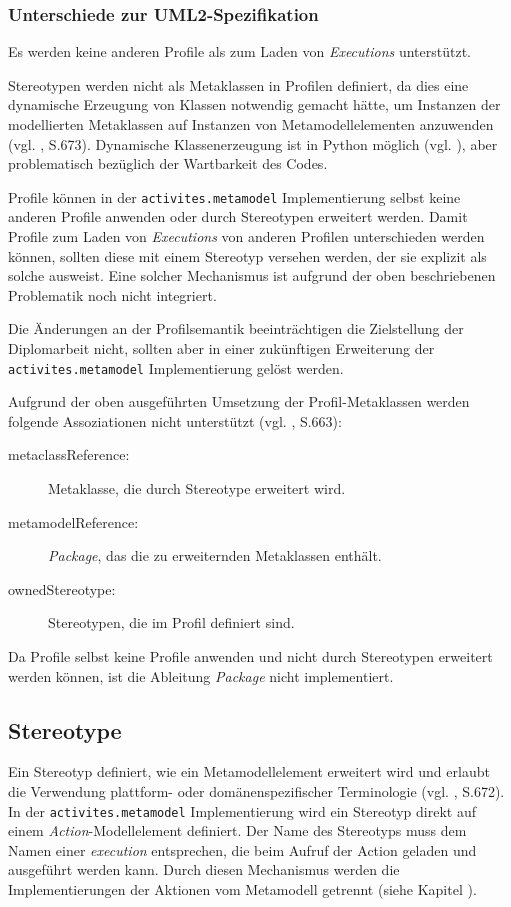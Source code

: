 \subsubsection{Unterschiede zur UML2-Spezifikation}
Es werden keine anderen Profile als zum Laden von \emph{Executions} unterstützt.

Stereotypen werden nicht als Metaklassen in Profilen definiert, da dies eine dynamische Erzeugung von Klassen notwendig gemacht hätte, um Instanzen der modellierten Metaklassen auf Instanzen von Metamodellelementen anzuwenden (vgl. \citep{OMG2009}, S.673). Dynamische Klassenerzeugung ist in Python möglich (vgl. \citep{Py26Type}), aber problematisch bezüglich der Wartbarkeit des Codes.

Profile können in der \texttt{activites.metamodel} Implementierung selbst keine anderen Profile anwenden oder durch Stereotypen erweitert werden. Damit Profile zum Laden von \emph{Executions} von anderen Profilen unterschieden werden können, sollten diese mit einem Stereotyp versehen werden, der sie explizit als solche ausweist. Eine solcher Mechanismus ist aufgrund der oben beschriebenen Problematik noch nicht integriert.

Die Änderungen an der Profilsemantik beeinträchtigen die Zielstellung der Diplomarbeit nicht, sollten aber in einer zukünftigen Erweiterung der \texttt{activites.metamodel} Implementierung gelöst werden.

Aufgrund der oben ausgeführten Umsetzung der Profil-Metaklassen werden folgende Assoziationen nicht unterstützt (vgl. \citep{OMG2009}, S.663):
\begin{description}
\item[metaclassReference:] Metaklasse, die durch Stereotype erweitert wird.
\item[metamodelReference:] \emph{Package}, das die zu erweiternden Metaklassen enthält.
\item[ownedStereotype:] Stereotypen, die im Profil definiert sind.
\end{description}

Da Profile selbst keine Profile anwenden und nicht durch Stereotypen erweitert werden können, ist die Ableitung \emph{Package} nicht implementiert.


\subsection{Stereotype}
Ein Stereotyp definiert, wie ein Metamodellelement erweitert wird und erlaubt die Verwendung plattform- oder domänenspezifischer Terminologie (vgl. \citep{OMG2009}, S.672).
In der \texttt{activites.metamodel} Implementierung wird ein Stereotyp direkt auf einem \emph{Action}-Modellelement definiert. Der Name des Stereotyps muss dem Namen einer \emph{execution} entsprechen, die beim Aufruf der Action geladen und ausgeführt werden kann. Durch diesen Mechanismus werden die Implementierungen der Aktionen vom Metamodell getrennt (siehe Kapitel ).

